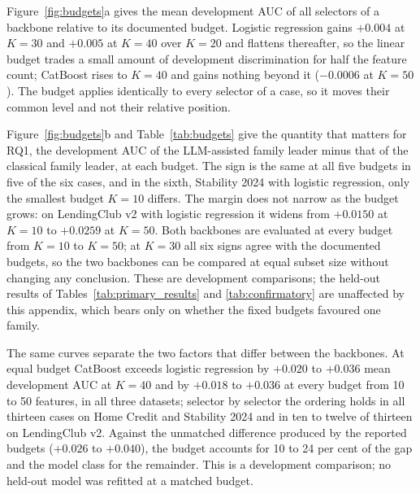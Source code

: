 \documentclass[final,5p,twocolumn]{elsarticle}
\newcommand{\Kfeat}{K}
\begin{document}
Figure~\ref{fig:budgets}a gives the mean development AUC of all selectors of a backbone relative to its documented budget. Logistic regression gains $+0.004$ at $\Kfeat=30$ and $+0.005$ at $\Kfeat=40$ over $\Kfeat=20$ and flattens thereafter, so the linear budget trades a small amount of development discrimination for half the feature count; CatBoost rises to $\Kfeat=40$ and gains nothing beyond it ($-0.0006$ at $\Kfeat=50$). The budget applies identically to every selector of a case, so it moves their common level and not their relative position.

Figure~\ref{fig:budgets}b and Table~\ref{tab:budgets} give the quantity that matters for RQ1, the development AUC of the LLM-assisted family leader minus that of the classical family leader, at each budget. The sign is the same at all five budgets in five of the six cases, and in the sixth, Stability 2024 with logistic regression, only the smallest budget $\Kfeat=10$ differs. The margin does not narrow as the budget grows: on LendingClub v2 with logistic regression it widens from $+0.0150$ at $\Kfeat=10$ to $+0.0259$ at $\Kfeat=50$. Both backbones are evaluated at every budget from $\Kfeat=10$ to $\Kfeat=50$; at $\Kfeat=30$ all six signs agree with the documented budgets, so the two backbones can be compared at equal subset size without changing any conclusion. These are development comparisons; the held-out results of Tables~\ref{tab:primary_results} and \ref{tab:confirmatory} are unaffected by this appendix, which bears only on whether the fixed budgets favoured one family.

The same curves separate the two factors that differ between the backbones. At equal budget CatBoost exceeds logistic regression by $+0.020$ to $+0.036$ mean development AUC at $\Kfeat=40$ and by $+0.018$ to $+0.036$ at every budget from 10 to 50 features, in all three datasets; selector by selector the ordering holds in all thirteen cases on Home Credit and Stability 2024 and in ten to twelve of thirteen on LendingClub v2. Against the unmatched difference produced by the reported budgets ($+0.026$ to $+0.040$), the budget accounts for 10 to 24 per cent of the gap and the model class for the remainder. This is a development comparison; no held-out model was refitted at a matched budget.
\end{document}
